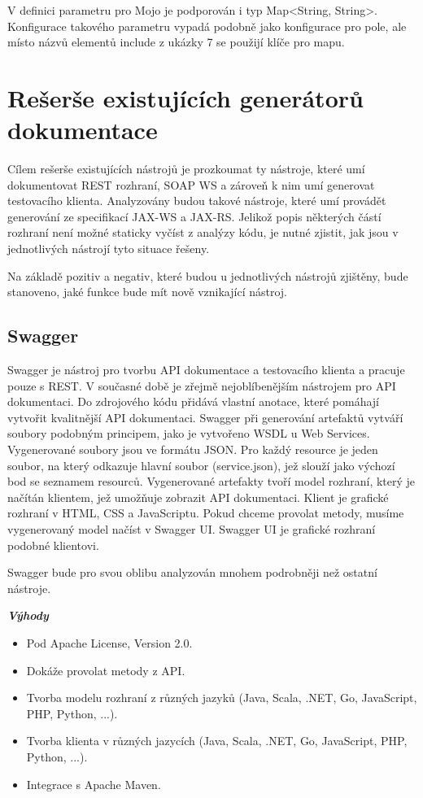 \documentclass[11pt,twoside,a4paper]{book}
\begin{document}
V definici parametru pro Mojo je podporován i typ Map<String, String>. Konfigurace
takového parametru vypadá podobně jako konfigurace pro pole, ale místo názvů elementů
include z ukázky 7 se použijí klíče pro mapu.

\section{Rešerše existujících generátorů dokumentace}

Cílem rešerše existujících nástrojů je prozkoumat ty nástroje, které umí dokumentovat REST
rozhraní, SOAP WS a zároveň k nim umí generovat testovacího klienta. Analyzovány budou
takové nástroje, které umí provádět generování ze specifikací JAX-WS a JAX-RS. Jelikož
popis některých částí rozhraní není možné staticky vyčíst z analýzy kódu, je nutné zjistit, jak
jsou v jednotlivých nástrojí tyto situace řešeny.

Na základě pozitiv a negativ, které budou u jednotlivých nástrojů zjištěny, bude stanoveno,
jaké funkce bude mít nově vznikající nástroj.

\subsection{Swagger}

Swagger je nástroj pro tvorbu API dokumentace a testovacího klienta a pracuje pouze s REST.
V současné době je zřejmě nejoblíbenějším nástrojem pro API dokumentaci. Do zdrojového
kódu přidává vlastní anotace, které pomáhají vytvořit kvalitnější API dokumentaci. Swagger
při generování artefaktů vytváří soubory podobným principem, jako je vytvořeno WSDL u
Web Services. Vygenerované soubory jsou ve formátu JSON. Pro každý resource je jeden
soubor, na který odkazuje hlavní soubor (service.json), jež slouží jako výchozí bod se
seznamem resourců. Vygenerované artefakty tvoří model rozhraní, který je načítán klientem,
jež umožňuje zobrazit API dokumentaci. Klient je grafické rozhraní v HTML, CSS a
JavaScriptu. Pokud chceme provolat metody, musíme vygenerovaný model načíst v Swagger
UI. Swagger UI je grafické rozhraní podobné klientovi.

Swagger bude pro svou oblibu analyzován mnohem podrobněji než ostatní nástroje.

\textbf{\textit{Výhody}}

\begin{itemize}
  \item Pod Apache License, Version 2.0.
  \item Dokáže provolat metody z API.
  \item Tvorba modelu rozhraní z různých jazyků (Java, Scala, .NET, Go, JavaScript, PHP,
Python, ...).
  \item Tvorba klienta v různých jazycích (Java, Scala, .NET, Go, JavaScript, PHP, Python,
...).
\item Integrace s Apache Maven.
\end{itemize}
\end{document}
